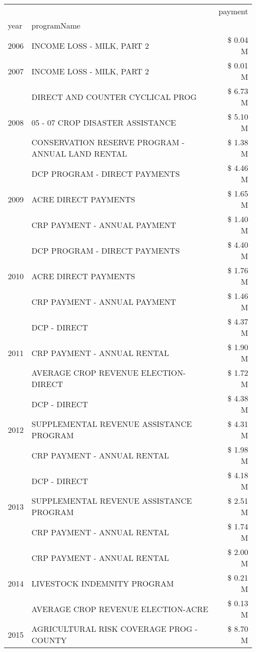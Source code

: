 \begin{tabular}{llr}
\toprule
 &  & payment \\
year & programName &  \\
\midrule
2006 & INCOME LOSS - MILK, PART 2 & \$ 0.04 M \\
\cline{1-3}
2007 & INCOME LOSS - MILK, PART 2 & \$ 0.01 M \\
\cline{1-3}
\multirow[t]{3}{*}{2008} & DIRECT AND COUNTER CYCLICAL PROG & \$ 6.73 M \\
 & 05 - 07 CROP DISASTER ASSISTANCE & \$ 5.10 M \\
 & CONSERVATION RESERVE PROGRAM - ANNUAL LAND RENTAL & \$ 1.38 M \\
\cline{1-3}
\multirow[t]{3}{*}{2009} & DCP PROGRAM - DIRECT PAYMENTS & \$ 4.46 M \\
 & ACRE DIRECT PAYMENTS & \$ 1.65 M \\
 & CRP PAYMENT - ANNUAL PAYMENT & \$ 1.40 M \\
\cline{1-3}
\multirow[t]{3}{*}{2010} & DCP PROGRAM - DIRECT PAYMENTS & \$ 4.40 M \\
 & ACRE DIRECT PAYMENTS & \$ 1.76 M \\
 & CRP PAYMENT - ANNUAL PAYMENT & \$ 1.46 M \\
\cline{1-3}
\multirow[t]{3}{*}{2011} & DCP - DIRECT & \$ 4.37 M \\
 & CRP PAYMENT - ANNUAL RENTAL & \$ 1.90 M \\
 & AVERAGE CROP REVENUE ELECTION-DIRECT & \$ 1.72 M \\
\cline{1-3}
\multirow[t]{3}{*}{2012} & DCP - DIRECT & \$ 4.38 M \\
 & SUPPLEMENTAL REVENUE ASSISTANCE PROGRAM & \$ 4.31 M \\
 & CRP PAYMENT - ANNUAL RENTAL & \$ 1.98 M \\
\cline{1-3}
\multirow[t]{3}{*}{2013} & DCP - DIRECT & \$ 4.18 M \\
 & SUPPLEMENTAL REVENUE ASSISTANCE PROGRAM & \$ 2.51 M \\
 & CRP PAYMENT - ANNUAL RENTAL & \$ 1.74 M \\
\cline{1-3}
\multirow[t]{3}{*}{2014} & CRP PAYMENT - ANNUAL RENTAL & \$ 2.00 M \\
 & LIVESTOCK INDEMNITY PROGRAM & \$ 0.21 M \\
 & AVERAGE CROP REVENUE ELECTION-ACRE & \$ 0.13 M \\
\cline{1-3}
\multirow[t]{3}{*}{2015} & AGRICULTURAL RISK COVERAGE PROG - COUNTY & \$ 8.70 M \\

\end{tabular}
